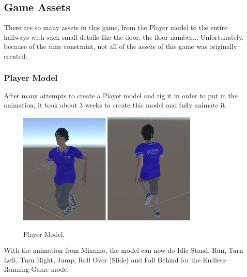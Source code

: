 \documentclass[12pt]{article}
\begin{document}
\subsection{Game Assets}
\hspace*{1.5em}There are so many assets in this game, from the Player model to the entire hallways with such small details like the door, the floor number... 
Unfortunately, because of the time constraint, not all of the assets of this game was originally created. 

\subsubsection{Player Model}
\hspace*{1.5em}After many attempts to create a Player model and rig it in order to put in the animation, it took about 3 weeks to create this model and fully animate it.\\
\begin{figure}[H]
    \centering
    \includegraphics[width=0.4\textwidth]{front.png}
    \includegraphics[width=0.4\textwidth]{back.png}
    \caption{Player Model.}
\end{figure}
With the animation from Mixamo, the model can now do Idle Stand, Run, Turn Left, Turn Right, Jump, Roll Over (Slide) and Fall Behind for the Endless-Running Game mode.
\end{document}
